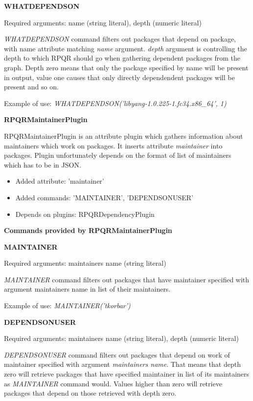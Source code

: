 \textbf{WHATDEPENDSON}

Required arguments: name (string literal), depth (numeric literal)

\textit{WHATDEPENDSON} command filters out packages that depend on package, with name attribute matching
\textit{name} argument. \textit{depth} argument is controlling the depth to which RPQR
should go when gathering dependent packages from the graph. Depth zero means that only the package specified
by name will be present in output, value one causes that only directly dependendent packages will be present and
so on.

Example of use: \textit{WHATDEPENDSON('libyang-1.0.225-1.fc34.x86\_64', 1)}

\textbf{RPQRMaintainerPlugin}

RPQRMaintainerPlugin is an attribute plugin which gathers information about maintainers which work
on packages. It inserts attribute \textit{maintainer} into packages. Plugin unfortunately depends
on the format of list of maintainers which has to be in JSON.

\begin{itemize}
  \item Added attribute: 'maintainer'
  \item Added commands: 'MAINTAINER', 'DEPENDSONUSER'
  \item Depends on plugins: RPQRDependencyPlugin
\end{itemize}

\textbf{Commands provided by RPQRMaintainerPlugin}

\textbf{MAINTAINER}

Required arguments: maintainers name (string literal)

\textit{MAINTAINER} command filters out packages that have maintainer specified with argument
maintainers name in list of their maintainers.

Example of use: \textit{MAINTAINER('tkorbar')}

\textbf{DEPENDSONUSER}

Required arguments: maintainers name (string literal), depth (numeric literal)

\textit{DEPENDSONUSER} command filters out packages that depend on work of maintainer specified with
argument \textit{maintainers name}. That means that depth zero will retrieve packages that have specified
maintainer in list of its maintainers as \textit{MAINTAINER} command would. Values higher than zero
will retrieve packages that depend on those retrieved with depth zero.

